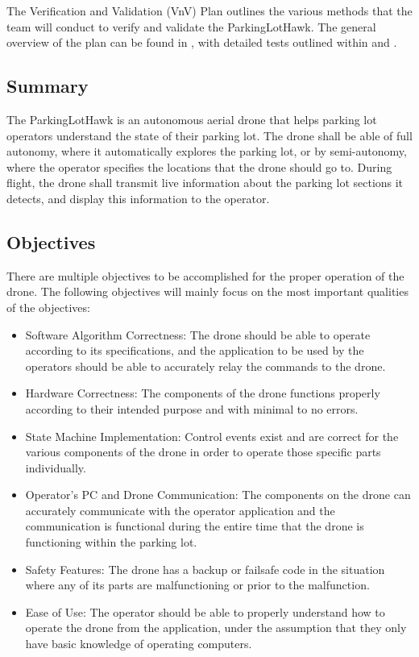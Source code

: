 \documentclass[12pt, titlepage]{article}
\begin{document}
The Verification and Validation (VnV) Plan outlines the various methods that the team will conduct to verify and validate the ParkingLotHawk. The general overview of the plan can be found in , with detailed tests outlined within  and .

\subsection{Summary}

The ParkingLotHawk is an autonomous aerial drone that helps parking lot operators understand the state of their parking lot. The drone shall be able of full autonomy, where it automatically explores the parking lot, or by semi-autonomy, where the operator specifies the locations that the drone should go to. During flight, the drone shall transmit live information about the parking lot sections it detects, and display this information to the operator. 

\subsection{Objectives}

There are multiple objectives to be accomplished for the proper operation of the drone. The following objectives will mainly focus on the most important qualities of the objectives:

\begin{itemize}
    \item Software Algorithm Correctness: The drone should be able to operate according to its specifications, and the application to be used by the operators should be able to accurately relay the commands to the drone.
    \item Hardware Correctness: The components of the drone functions properly according to their intended purpose and with minimal to no errors.
    \item State Machine Implementation: Control events exist and are correct for the various components of the drone in order to operate those specific parts individually.
    \item Operator's PC and Drone Communication: The components on the drone can accurately communicate with the operator application and the communication is functional during the entire time that the drone is functioning within the parking lot.
    \item Safety Features: The drone has a backup or failsafe code in the situation where any of its parts are malfunctioning or prior to the malfunction.
    \item Ease of Use: The operator should be able to properly understand how to operate the drone from the application, under the assumption that they only have basic knowledge of operating computers.
\end{itemize}
\end{document}
